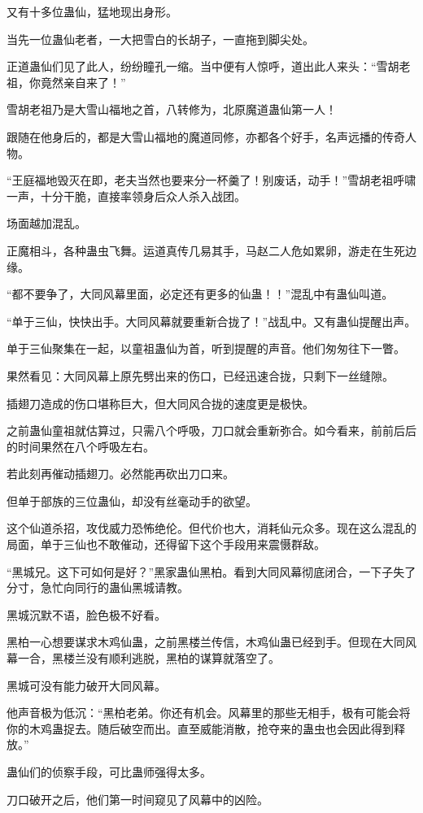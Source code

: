 \begin{this_body}
又有十多位蛊仙，猛地现出身形。

当先一位蛊仙老者，一大把雪白的长胡子，一直拖到脚尖处。

正道蛊仙们见了此人，纷纷瞳孔一缩。当中便有人惊呼，道出此人来头：“雪胡老祖，你竟然亲自来了！”

雪胡老祖乃是大雪山福地之首，八转修为，北原魔道蛊仙第一人！

跟随在他身后的，都是大雪山福地的魔道同修，亦都各个好手，名声远播的传奇人物。

“王庭福地毁灭在即，老夫当然也要来分一杯羹了！别废话，动手！”雪胡老祖呼啸一声，十分干脆，直接率领身后众人杀入战团。

场面越加混乱。

正魔相斗，各种蛊虫飞舞。运道真传几易其手，马赵二人危如累卵，游走在生死边缘。

“都不要争了，大同风幕里面，必定还有更多的仙蛊！！”混乱中有蛊仙叫道。

“单于三仙，快快出手。大同风幕就要重新合拢了！”战乱中。又有蛊仙提醒出声。

单于三仙聚集在一起，以童祖蛊仙为首，听到提醒的声音。他们匆匆往下一瞥。

果然看见：大同风幕上原先劈出来的伤口，已经迅速合拢，只剩下一丝缝隙。

插翅刀造成的伤口堪称巨大，但大同风合拢的速度更是极快。

之前蛊仙童祖就估算过，只需八个呼吸，刀口就会重新弥合。如今看来，前前后后的时间果然在八个呼吸左右。

若此刻再催动插翅刀。必然能再砍出刀口来。

但单于部族的三位蛊仙，却没有丝毫动手的欲望。

这个仙道杀招，攻伐威力恐怖绝伦。但代价也大，消耗仙元众多。现在这么混乱的局面，单于三仙也不敢催动，还得留下这个手段用来震慑群敌。

“黑城兄。这下可如何是好？”黑家蛊仙黑柏。看到大同风幕彻底闭合，一下子失了分寸，急忙向同行的蛊仙黑城请教。

黑城沉默不语，脸色极不好看。

黑柏一心想要谋求木鸡仙蛊，之前黑楼兰传信，木鸡仙蛊已经到手。但现在大同风幕一合，黑楼兰没有顺利逃脱，黑柏的谋算就落空了。

黑城可没有能力破开大同风幕。

他声音极为低沉：“黑柏老弟。你还有机会。风幕里的那些无相手，极有可能会将你的木鸡蛊捉去。随后破空而出。直至威能消散，抢夺来的蛊虫也会因此得到释放。”

蛊仙们的侦察手段，可比蛊师强得太多。

刀口破开之后，他们第一时间窥见了风幕中的凶险。


\end{this_body}

